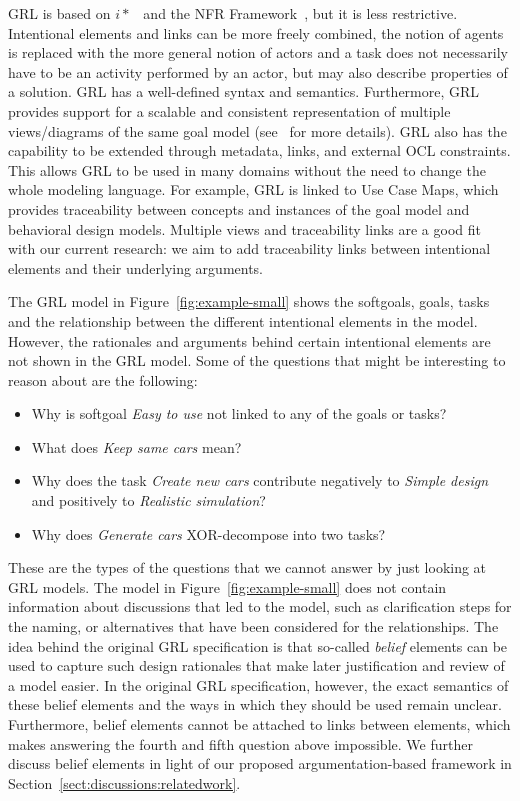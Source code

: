 GRL is based on $i*$~\cite{yu1997towards} and the NFR Framework~\cite{chung2012non}, but it is less restrictive. Intentional elements and links can be more freely combined, the notion of agents is replaced with the more general notion of actors and a task does not necessarily have to be an activity performed by an actor, but may also describe properties of a solution. GRL has a well-defined syntax and semantics. Furthermore, GRL provides support for a scalable and consistent representation of multiple views/diagrams of the same goal model (see~\cite[Ch.2]{Ghanavati2013} for more details). GRL also has the capability to be extended through metadata, links, and external OCL constraints. This allows GRL to be used in many domains without the need to change the whole modeling language. For example, GRL is linked to Use Case Maps, which provides traceability between concepts and instances of the goal model and behavioral design models. Multiple views and traceability links are a good fit with our current research: we aim to add traceability links between intentional elements and their underlying arguments. 

The GRL model in Figure~\ref{fig:example-small} shows the softgoals, goals, tasks and the relationship between the different intentional elements in the model. However, the rationales and arguments behind certain intentional elements are not shown in the GRL model. Some of the questions that might be interesting to reason about are the following:

\begin{itemize}
	\item Why is softgoal \emph{Easy to use} not linked to any of the goals or tasks? 
	\item What does \emph{Keep same cars} mean?
	\item Why does the task \emph{Create new cars} contribute negatively to \emph{Simple design} and positively to \emph{Realistic simulation}?
	\item Why does \emph{Generate cars} XOR-decompose into two tasks?
\end{itemize}

These are the types of the questions that we cannot answer by just looking at GRL models. The model in Figure~\ref{fig:example-small} does not contain information about discussions that led to the model, such as clarification steps for the naming, or alternatives that have been considered for the relationships. The idea behind the original GRL specification is that so-called \emph{belief} elements can be used to capture such design rationales that make later justification and review of a model easier. In the original GRL specification, however, the exact semantics of these belief elements and the ways in which they should be used remain unclear. Furthermore, belief elements cannot be attached to links between elements, which makes answering the fourth and fifth question above impossible. We further discuss belief elements in light of our proposed argumentation-based framework in Section~\ref{sect:discussions:relatedwork}. 

